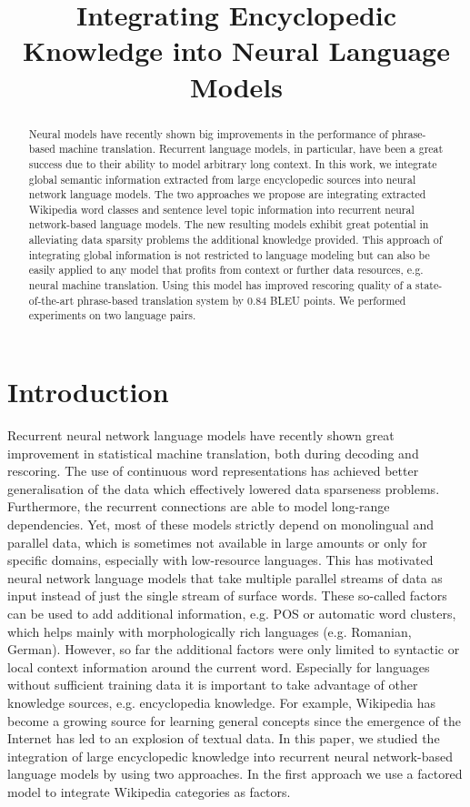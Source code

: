 \documentclass[a4paper]{article}
\title{Integrating Encyclopedic Knowledge into Neural Language Models}
\begin{document}
\maketitle
%
\begin{abstract}
Neural models have recently shown big improvements in the performance of phrase-based machine translation. Recurrent language models, in particular, have been a great success due to their ability to model arbitrary long context. In this work, we integrate global semantic information extracted from large encyclopedic sources into neural network language models. The two approaches we propose are integrating extracted Wikipedia word classes and sentence level topic information into recurrent neural network-based language models. 
The new resulting models exhibit great potential in alleviating data sparsity problems  the additional knowledge provided. This approach of integrating global information is not restricted to language modeling but can also be easily applied to any model that profits from context or further data resources, e.g. neural machine translation. Using this model has improved rescoring quality of a state-of-the-art phrase-based translation system by 0.84 BLEU points. We performed experiments on two language pairs.



\end{abstract}


%
\section{Introduction}
Recurrent neural network language models have recently shown great improvement in statistical machine translation, both during decoding and rescoring. The use of continuous word representations has achieved better generalisation of the data which effectively lowered data sparseness problems. Furthermore, the recurrent connections are able to model long-range dependencies. Yet, most of these models strictly depend on monolingual and parallel data, which is sometimes not available in large amounts or only for specific domains, especially with low-resource languages.
This has motivated neural network language models that take multiple parallel streams of data as input instead of just the single stream of surface words. These so-called factors can be used to add additional information, e.g. POS or automatic word clusters, which helps mainly with morphologically rich languages (e.g. Romanian, German). However, so far the additional factors were only limited to syntactic or local context information around the current word. Especially for languages without sufficient training data it is important to take advantage of other knowledge sources, e.g. encyclopedia knowledge. For example, Wikipedia has become a growing source for learning general concepts since the emergence of the Internet has led to an explosion of textual data. 
In this paper, we studied the integration of large encyclopedic knowledge into recurrent neural network-based language models by using two approaches. 
In the first approach we use a factored model to integrate Wikipedia categories as factors. 
\end{document}
